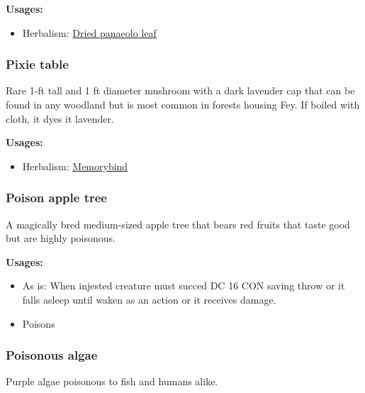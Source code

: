\textbf{Usages:}

\begin{itemize}[noitemsep]
\item[] Herbalism: \hyperref[Dried panaeolo leaf]{Dried panaeolo leaf}
\end{itemize}

\subsubsection{Pixie table}
\label{Pixie table}

Rare 1-ft tall and 1 ft diameter mushroom with a dark lavender cap that can be found in any woodland but is most common in forests housing Fey. If boiled with cloth, it dyes it lavender.

\vspace{5mm}

\textbf{Usages:}

\begin{itemize}[noitemsep]
\item[] Herbalism: \hyperref[Memorybind]{Memorybind}
\end{itemize}

\subsubsection{Poison apple tree}
\label{Poison apple tree}

A magically bred medium-sized apple tree that bears red fruits that taste good but are highly poisonous.

\vspace{5mm}

\textbf{Usages:}

\begin{itemize}[noitemsep]
\item[] As is: When injested creature must succed DC 16 CON saving throw or it falls asleep until waken as an action or it receives damage.
\item[] Poisons \poison\poison
\end{itemize}

\subsubsection{Poisonous algae}
\label{Poisonous algae}

Purple algae poisonous to fish and humans alike.

\vspace{5mm}

